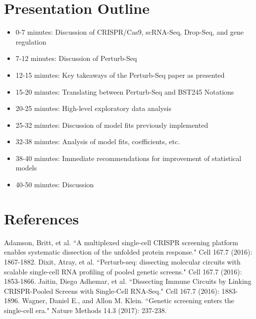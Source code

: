 \documentclass{article}\usepackage[]{graphicx}\usepackage[]{color}
\begin{document}
\section*{Presentation Outline}
\begin{itemize}
  \item 0-7 minutes: Discussion of CRISPR/Cas9, scRNA-Seq, Drop-Seq, and gene regulation
  \item 7-12 minutes: Discussion of Perturb-Seq
  \item 12-15 minutes: Key takeaways of the Perturb-Seq paper as presented
  \item 15-20 minutes: Translating between Perturb-Seq and BST245 Notations
  \item 20-25 minutes: High-level exploratory data analysis 
  \item 25-32 minutes: Discussion of model fits previously implemented
  \item 32-38 minutes: Analysis of model fits, coefficients, etc. 
  \item 38-40 minutes: Immediate recommendations for improvement of statistical models
  \item 40-50 minutes: Discussion 

  
\end{itemize}


\section*{References}
Adamson, Britt, et al. ``A multiplexed single-cell CRISPR screening platform enables systematic dissection of the unfolded protein response." Cell 167.7 (2016): 1867-1882. \newline \newline
Dixit, Atray, et al. ``Perturb-seq: dissecting molecular circuits with scalable single-cell RNA profiling of pooled genetic screens." Cell 167.7 (2016): 1853-1866. \newline \newline
Jaitin, Diego Adhemar, et al. ``Dissecting Immune Circuits by Linking CRISPR-Pooled Screens with Single-Cell RNA-Seq." Cell 167.7 (2016): 1883-1896. \newline \newline
Wagner, Daniel E., and Allon M. Klein. ``Genetic screening enters the single-cell era." Nature Methods 14.3 (2017): 237-238.
\end{document}
